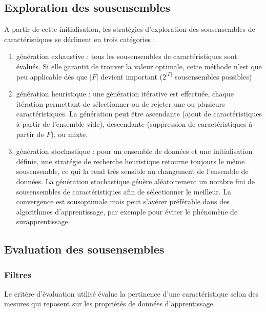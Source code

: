\documentclass[letterpaper,10pt,french]{sphinxmanual}
\begin{document}
\subsection{Exploration des sous\sphinxhyphen{}ensembles}
\label{\detokenize{selection:exploration-des-sous-ensembles}}
\sphinxAtStartPar
A partir de cette initialisation, les stratégies d’exploration des sous\sphinxhyphen{}ensembles de caractéristiques se déclinent en trois catégories :
\begin{enumerate}
%
\item {} 
\sphinxAtStartPar
génération exhaustive : tous les sous\sphinxhyphen{}ensembles de caractéristiques sont évalués. Si elle garantit de trouver la valeur optimale, cette méthode n’est que peu applicable dès que \(|F|\) devient important (\(2^{|F|}\) sous\sphinxhyphen{}ensembles possibles)

\item {} 
\sphinxAtStartPar
génération heuristique : une génération itérative est effectuée, chaque itération permettant de sélectionner ou de rejeter une ou plusieurs caractéristiques. La génération peut être ascendante (ajout de caractéristiques à partir de l’ensemble vide), descendante (suppression de caractéristiques à partir de \(F\)), ou mixte.

\item {} 
\sphinxAtStartPar
génération stochastique : pour un ensemble de données et une initialisation définie, une stratégie de recherche heuristique retourne toujours le même sous\sphinxhyphen{}ensemble, ce qui la rend très sensible au changement
de l’ensemble de données. La génération stochastique génère aléatoirement un nombre fini de sous\sphinxhyphen{}ensembles de caractéristiques afin de sélectionner le meilleur. La convergence est sous\sphinxhyphen{}optimale mais peut s’avérer préférable dans des algorithmes d’apprentissage, par exemple pour éviter le phénomène de surapprentissage.

\end{enumerate}


\subsection{Evaluation des sous\sphinxhyphen{}ensembles}
\label{\detokenize{selection:evaluation-des-sous-ensembles}}

\subsubsection{Filtres}
\label{\detokenize{selection:filtres}}
\sphinxAtStartPar
Le critère d’évaluation utilisé évalue la pertinence d’une caractéristique selon des mesures
qui reposent sur les propriétés de données d’apprentissage.
\end{document}
